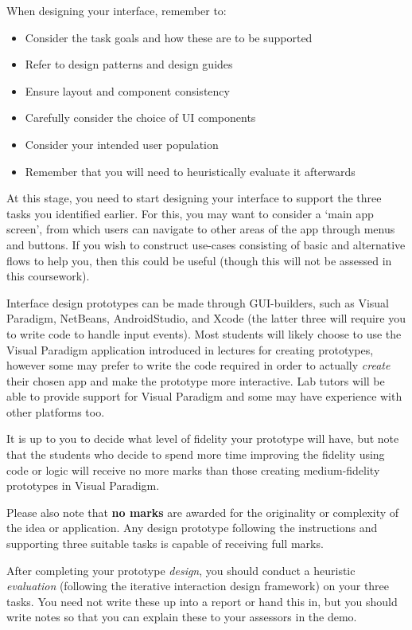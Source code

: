 \documentclass[11pt,a4paper]{report}
\begin{document}
When designing your interface, remember to:
\begin{itemize}
    \item Consider the task goals and how these are to be supported
    \item Refer to design patterns and design guides
    \item Ensure layout and component consistency
    \item Carefully consider the choice of UI components
    \item Consider your intended user population
    \item Remember that you will need to heuristically evaluate it afterwards
\end{itemize}
At this stage, you need to start designing your interface to support the three tasks you identified earlier. For this, you may want to consider a `main app screen', from which users can navigate to other areas of the app through menus and buttons. If you wish to construct use-cases consisting of basic and alternative flows to help you, then this could be useful (though this will not be assessed in this coursework). 

Interface design prototypes can be made through GUI-builders, such as Visual Paradigm, NetBeans, AndroidStudio, and Xcode (the latter three will require you to write code to handle input events). Most students will likely choose to use the Visual Paradigm application introduced in lectures for creating prototypes, however some may prefer to write the code required in order to actually \textit{create} their chosen app and make the prototype more interactive. Lab tutors will be able to provide support for Visual Paradigm and some may have experience with other platforms too. 

It is up to you to decide what level of fidelity your prototype will have, but note that the students who decide to spend more time improving the fidelity using code or logic will receive no more marks than those creating medium-fidelity prototypes in Visual Paradigm.

Please also note that \textbf{no marks} are awarded for the originality or complexity of the idea or application. Any design prototype following the instructions and supporting three suitable tasks is capable of receiving full marks.

After completing your prototype \textit{design}, you should conduct a heuristic \textit{evaluation} (following the iterative interaction design framework) on your three tasks. You need not write these up into a report or hand this in, but you should write notes so that you can explain these to your assessors in the demo.
\end{document}
